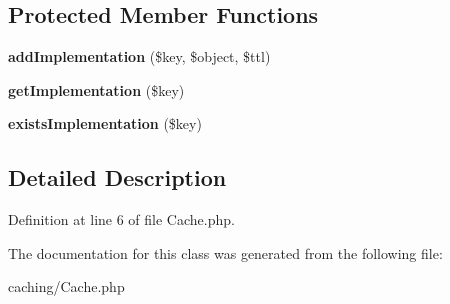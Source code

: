 \subsection*{Protected Member Functions}
\begin{DoxyCompactItemize}
\item 
\hypertarget{class_cache_af521b9d598d3ba8ff91dada0dd0694c9}{
{\bfseries addImplementation} (\$key, \$object, \$ttl)}
\label{class_cache_af521b9d598d3ba8ff91dada0dd0694c9}

\item 
\hypertarget{class_cache_adce551ca7c5b491845d8c985b8d3064b}{
{\bfseries getImplementation} (\$key)}
\label{class_cache_adce551ca7c5b491845d8c985b8d3064b}

\item 
\hypertarget{class_cache_a4497c1179a0c48ad066c62806ff6b13b}{
{\bfseries existsImplementation} (\$key)}
\label{class_cache_a4497c1179a0c48ad066c62806ff6b13b}

\end{DoxyCompactItemize}


\subsection{Detailed Description}


Definition at line 6 of file Cache.php.



The documentation for this class was generated from the following file:\begin{DoxyCompactItemize}
\item 
caching/Cache.php\end{DoxyCompactItemize}
